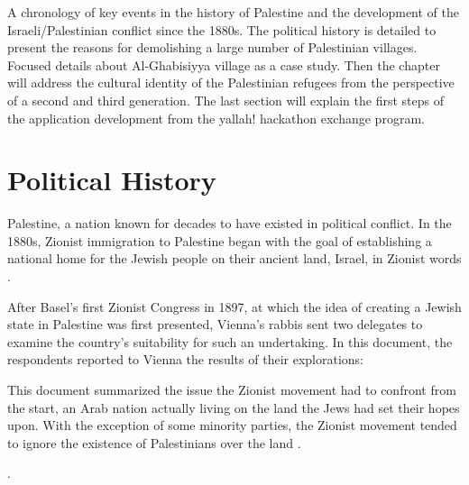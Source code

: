A chronology of key events in the history of Palestine and the development of the Israeli/Palestinian conflict since the 1880s. The political history is detailed to present the reasons for demolishing a large number of Palestinian villages. Focused details about Al-Ghabisiyya village as a case study. Then the chapter will address the cultural identity of the Palestinian refugees from the perspective of a second and third generation. The last section will explain the first steps of the application development from the \acrshort{yallah!} hackathon exchange program.  
\section{Political History}

Palestine, a nation known for decades to have existed in political conflict. In the 1880s, Zionist immigration to Palestine began with the goal of establishing a national home for the Jewish people on their ancient land, Israel, in Zionist words \citep{Morris2004, Pappe2006, Khalidi2015}.

After Basel's first Zionist Congress in 1897, at which the idea of creating a Jewish state in Palestine was first presented, Vienna's rabbis sent two delegates to examine the country's suitability for such an undertaking. 
In this document, the respondents reported to Vienna the results of their explorations:





\centerline{\textit{}}


This document summarized the issue the Zionist movement had to confront from the start, an Arab nation actually living on the land the Jews had set their hopes upon. With the exception of some minority parties, the Zionist movement tended to ignore the existence of Palestinians over the land \citep{Shlaim2014, Karmi2007}.

 \cite[p.11]{Pappe2006}.



